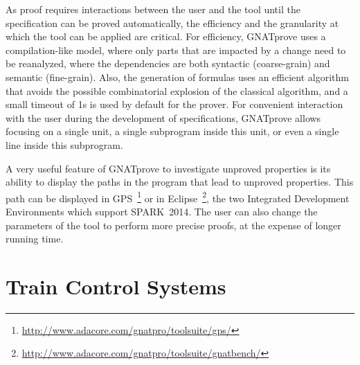 \documentclass[10pt,a4paper,twocolumn]{article}
\newcommand{\DOC}{\textsc{do-178c}\xspace}
\newcommand{\gnatprove}{GNATprove\xspace}
\newcommand{\newspark}{SPARK~2014\xspace}
\begin{document}
As proof requires interactions between the user and the tool until the
specification can be proved automatically, the efficiency and the granularity
at which the tool can be applied are critical. For efficiency, \gnatprove uses
a compilation-like model, where only parts that are impacted by a change need
to be reanalyzed, where the dependencies are both syntactic (coarse-grain) and
semantic (fine-grain). Also, the generation of formulas uses an efficient
algorithm~\cite{leino:2005:ipl} that avoids the possible combinatorial
explosion of the classical algorithm, and a small timeout of 1s is used by
default for the prover. For convenient interaction with the user during the
development of specifications, \gnatprove allows focusing on a single unit, a
single subprogram inside this unit, or even a single line inside this
subprogram.

A very useful feature of \gnatprove to investigate unproved properties is its
ability to display the paths in the program that lead to unproved
properties. This path can be displayed in
GPS~\footnote{\url{http://www.adacore.com/gnatpro/toolsuite/gps/}} or in
Eclipse~\footnote{\url{http://www.adacore.com/gnatpro/toolsuite/gnatbench/}},
the two Integrated Development Environments which support \newspark. The user
can also change the parameters of the tool to perform more precise proofs, at
the expense of longer running time.



\section{Train Control Systems}
\end{document}
